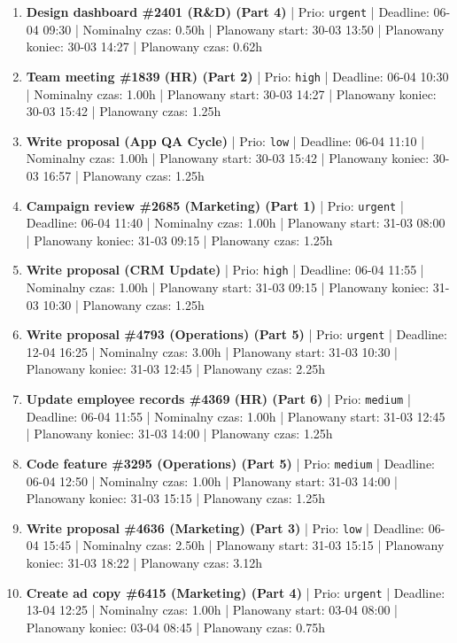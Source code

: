 {\begin{enumerate}
  \item [\textbf{14603}] \textbf{Design dashboard \#2401 (R\&D) (Part 4)} | Prio: \texttt{urgent} | Deadline: 06-04 09:30 | Nominalny czas: 0.50h | Planowany start: 30-03 13:50 | Planowany koniec: 30-03 14:27 | Planowany czas: 0.62h
  \item [\textbf{14610}] \textbf{Team meeting \#1839 (HR) (Part 2)} | Prio: \texttt{high} | Deadline: 06-04 10:30 | Nominalny czas: 1.00h | Planowany start: 30-03 14:27 | Planowany koniec: 30-03 15:42 | Planowany czas: 1.25h
  \item [\textbf{14695}] \textbf{Write proposal (App QA Cycle)} | Prio: \texttt{low} | Deadline: 06-04 11:10 | Nominalny czas: 1.00h | Planowany start: 30-03 15:42 | Planowany koniec: 30-03 16:57 | Planowany czas: 1.25h
  \item [\textbf{14607}] \textbf{Campaign review \#2685 (Marketing) (Part 1)} | Prio: \texttt{urgent} | Deadline: 06-04 11:40 | Nominalny czas: 1.00h | Planowany start: 31-03 08:00 | Planowany koniec: 31-03 09:15 | Planowany czas: 1.25h
  \item [\textbf{14629}] \textbf{Write proposal (CRM Update)} | Prio: \texttt{high} | Deadline: 06-04 11:55 | Nominalny czas: 1.00h | Planowany start: 31-03 09:15 | Planowany koniec: 31-03 10:30 | Planowany czas: 1.25h
  \item [\textbf{14600}] \textbf{Write proposal \#4793 (Operations) (Part 5)} | Prio: \texttt{urgent} | Deadline: 12-04 16:25 | Nominalny czas: 3.00h | Planowany start: 31-03 10:30 | Planowany koniec: 31-03 12:45 | Planowany czas: 2.25h
  \item [\textbf{14658}] \textbf{Update employee records \#4369 (HR) (Part 6)} | Prio: \texttt{medium} | Deadline: 06-04 11:55 | Nominalny czas: 1.00h | Planowany start: 31-03 12:45 | Planowany koniec: 31-03 14:00 | Planowany czas: 1.25h
  \item [\textbf{14645}] \textbf{Code feature \#3295 (Operations) (Part 5)} | Prio: \texttt{medium} | Deadline: 06-04 12:50 | Nominalny czas: 1.00h | Planowany start: 31-03 14:00 | Planowany koniec: 31-03 15:15 | Planowany czas: 1.25h
  \item [\textbf{14684}] \textbf{Write proposal \#4636 (Marketing) (Part 3)} | Prio: \texttt{low} | Deadline: 06-04 15:45 | Nominalny czas: 2.50h | Planowany start: 31-03 15:15 | Planowany koniec: 31-03 18:22 | Planowany czas: 3.12h
  \item [\textbf{14602}] \textbf{Create ad copy \#6415 (Marketing) (Part 4)} | Prio: \texttt{urgent} | Deadline: 13-04 12:25 | Nominalny czas: 1.00h | Planowany start: 03-04 08:00 | Planowany koniec: 03-04 08:45 | Planowany czas: 0.75h

\end{enumerate}}
